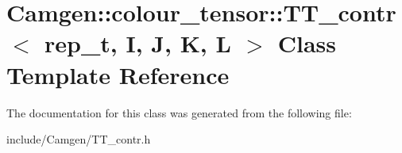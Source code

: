 \hypertarget{a00547}{}\section{Camgen\+:\+:colour\+\_\+tensor\+:\+:T\+T\+\_\+contr$<$ rep\+\_\+t, I, J, K, L $>$ Class Template Reference}
\label{a00547}


The documentation for this class was generated from the following file\+:\begin{DoxyCompactItemize}
\item 
include/\+Camgen/T\+T\+\_\+contr.\+h\end{DoxyCompactItemize}
